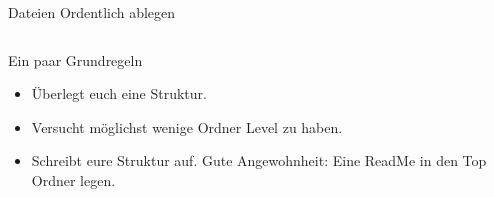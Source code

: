 \documentclass[aspectratio=169,shownotes]{beamer}
\begin{document}
\begin{frame}[t]{Dateien Ordentlich ablegen}
\begin{columns}
    \begin{column}{0.5\textwidth}
        \vspace{-8cm}
        \begin{block}{Ein paar Grundregeln}
            \begin{itemize}
                \item Überlegt euch eine Struktur.                 
                \item Versucht möglichst wenige Ordner Level zu haben.
                \item Schreibt eure Struktur auf. Gute Angewohnheit: Eine ReadMe in den Top Ordner legen.
            \end{itemize}     


\end{block}
\end{column}
\end{columns}
\end{frame}
\end{document}
